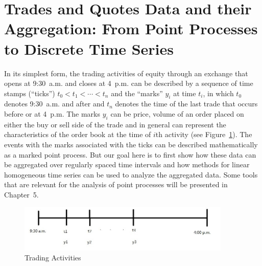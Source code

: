 \section{Trades and Quotes Data and their Aggregation: From Point Processes to Discrete Time Series \label{sec:tradesandquotes}}


In its simplest form, the trading activities of equity through an exchange that opens at 9:30~a.m. and closes at 4~p.m. can be described by a sequence of time stamps (``ticks'') $t_0 < t_1 < \cdots < t_n$ and the ``marks'' $y_i$ at time $t_i$, in which $t_0$ denotes 9:30~a.m. and after and $t_n$ denotes the time of the last trade that occurs before or at 4~p.m. The marks $y_i$ can be price, volume of an order placed on either the buy or sell side of the trade and in general can represent the characteristics of the order book at the time of $i$th activity (see Figure~\ref{fig:tradeactline}). The events with the marks associated with the ticks can be described mathematically as a marked point process. But our goal here is to first show how these data can be aggregated over regularly spaced time intervals and how methods for linear homogeneous time series can be used to analyze the aggregated data. Some tools that are relevant for the analysis of point processes will be presented in Chapter~5.
	\begin{figure}[!ht]
	\includegraphics[width=4in]{chapters/chapter_uvts/figures/33d1.jpg}
	\caption{Trading Activities \label{fig:tradeactline}}
	\end{figure}


